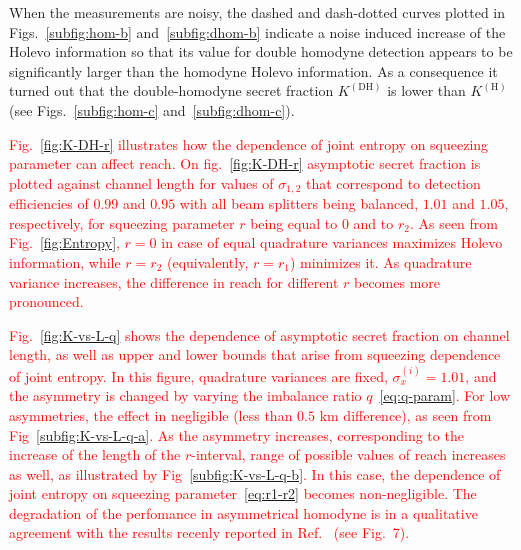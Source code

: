 \documentclass[%
reprint,
superscriptaddress,
 amsmath,amssymb,amsfonts,
 aps,
 pra,
 longbibliography
]{revtex4-2}
\newcommand{\ind}[1]{\mathrm{#1}}
\begin{document}
When the measurements are noisy,
the dashed and dash-dotted curves
plotted in Figs.~\ref{subfig:hom-b} and~\ref{subfig:dhom-b}
indicate a noise induced increase
of the Holevo information
so that its value
for double homodyne detection
appears to be
significantly larger than the homodyne Holevo information.
As a consequence
it turned out that
the double-homodyne secret fraction $K^{(\ind{DH})}$
is lower than $K^{(\ind{H})}$
(see Figs.~\ref{subfig:hom-c} and~\ref{subfig:dhom-c}).

 \textcolor{red}{Fig.~\ref{fig:K-DH-r} illustrates how the dependence of joint entropy on squeezing parameter can affect reach. On fig.~\ref{fig:K-DH-r} asymptotic secret fraction is plotted against channel length for values of $\sigma_{1,2}$ that correspond to detection efficiencies of $0.99$ and $0.95$ with all beam splitters being balanced, $1.01$ and $1.05$, respectively, for squeezing parameter $r$ being equal to $0$ and to $r_2$. As seen from Fig.~\ref{fig:Entropy}, $r=0$ in case of equal quadrature variances maximizes Holevo information, while $r=r_2$ (equivalently, $r=r_1$) minimizes it. As quadrature variance increases, the difference in reach for different $r$ becomes more pronounced.}

\textcolor{red}{Fig.~\ref{fig:K-vs-L-q} shows the dependence of asymptotic secret fraction on channel length, as well as upper and lower bounds that arise from squeezing dependence of joint entropy. In this figure, quadrature variances are fixed, $\sigma_x^{(i)}=1.01$, and the asymmetry is changed by varying the imbalance ratio $q$~\eqref{eq:q-param}. For low asymmetries, the effect in negligible (less than $0.5$ km difference), as seen from Fig~\ref{subfig:K-vs-L-q-a}. As the asymmetry increases, corresponding to the increase of the length of the $r$-interval, range of possible values of reach increases as well, as illustrated by Fig~\ref{subfig:K-vs-L-q-b}. In this case, the dependence of joint entropy on squeezing parameter~\eqref{eq:r1-r2} becomes non-negligible.}
\textcolor{red}{The degradation of the perfomance in asymmetrical homodyne is in a qualitative agreement with
the results recenly reported in
Ref.~\cite{Bartlett:25} (see Fig.~7).}


\end{document}
